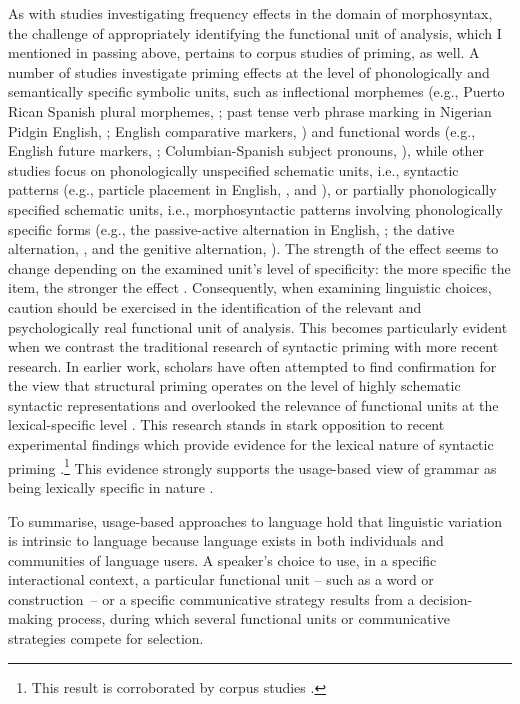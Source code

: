 As with studies investigating frequency effects in the domain of morphosyntax, the challenge of appropriately identifying the functional unit of analysis, which I mentioned in passing above, pertains to corpus studies of priming, as well. A number of studies investigate priming effects at the level of phonologically and semantically specific symbolic units, such as inflectional morphemes (e.g., Puerto Rican Spanish plural morphemes, \citealt{poplack-deletion80}; past tense verb phrase marking in Nigerian Pidgin English, \citealt{poplack-tagliamonte}; English comparative markers, \citealt{szmrecsanyi2006}) and functional words (e.g., English future markers, \citealt{szmrecsanyi2006}; Columbian-Spanish subject pronouns, \citealt{travis2005}), while other studies focus on  phonologically unspecified schematic units, i.e., syntactic patterns (e.g., particle placement in English, \citealt{gries2005}, and \citealt{szmrecsanyi2006}), or partially phonologically specified schematic units, i.e., morphosyntactic patterns involving phonologically specific forms (e.g., the passive-active alternation in English, \citealt{weiner-labov}; the dative alternation, \citealt{gries2005}, and the genitive alternation, \citealt{szmrecsanyi2006}). The strength of the effect seems to change depending on the examined unit's level of specificity: the more specific the item, the stronger the effect \citep[181--182]{szmrecsanyi2006}. Consequently, when examining linguistic choices, caution should be exercised in the identification of the relevant and psychologically real functional unit of analysis. This becomes particularly evident when we contrast the traditional research of syntactic priming with more recent research. In earlier work, scholars have often attempted to find confirmation for the view that structural priming operates on the level of highly schematic syntactic representations and overlooked the relevance of functional units at the lexical-specific level \citep{bock1986,szmrecsanyi2006}. This research stands in stark opposition to recent experimental findings which provide evidence for the lexical nature of syntactic priming \citep{pickering-branigan98,pickering-branigan1999,melinger-dobel2005}.\footnote{This result is corroborated by corpus studies \citep{gries2005}.} This evidence strongly supports the usage-based view of grammar as being lexically specific in nature \citep{lieven-pine-baldwin-1997,goldberg-2003,tomasello-constructing-2003,bybee-book-2010,diessel-review}.

To summarise, usage-based approaches to language hold that linguistic variation is intrinsic to language because language exists in both individuals and communities of language users. A speaker's choice to use, in a specific interactional context,  a particular functional unit -- such as a word or construction~-- or a specific communicative strategy results from a decision-making process, during which several functional units or communicative strategies compete for selection.

